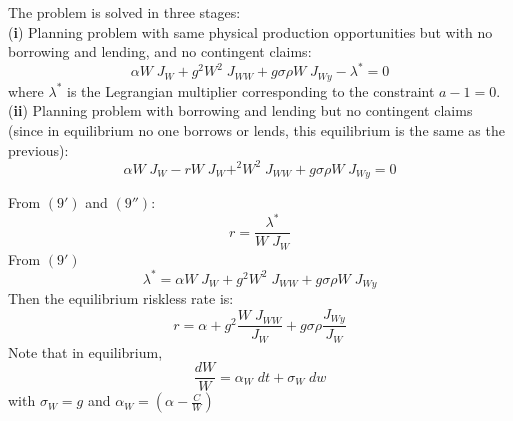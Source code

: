 \documentclass[
14pt,notheorems,hyperref={pdfauthor=whatever}
]{beamer}
\begin{document}
\begin{frame}
The problem is solved in three stages:\\
\hfill\break
(\textbf{i}) Planning problem with same physical production opportunities but with no borrowing and lending, and no contingent claims:\\
\begin{equation} \tag{9'}
    \alpha W \;J_W + g^2W^2 \;J_{WW} + g\sigma \rho W \;J_{Wy} - \lambda^* = 0
\end{equation}
where $\lambda^*$ is the Legrangian multiplier corresponding to the constraint $a-1=0$.\\
\hfill\break
(\textbf{ii}) Planning problem with borrowing and lending but no contingent claims (since in equilibrium no one borrows or lends, this equilibrium is the same as the previous):\\
\begin{equation} \tag{9''}
    \alpha W \;J_W - r W\;J_W + ^2W^2\;J_{WW} + g\sigma \rho W \;J_{Wy} = 0
\end{equation}
\end{frame}

\begin{frame}
From $(9')$ and $(9'')$:
\[ r = \frac{\lambda^*}{W\;J_W} \]
From $(9')$
\[ \lambda^* = \alpha W\;J_W + g^2W^2\;J_{WW} + g\sigma\rho W\;J_{Wy}\]
\hfill
Then the equilibrium riskless rate is:\\
\begin{equation} \tag{11}
    r = \alpha + g^2 \frac{W\;J_{WW}}{J_W} + g\sigma\rho \frac{J_{Wy}}{J_W}
\end{equation}
Note that in equilibrium,
\[ \frac{dW}{W} = \alpha_W\;dt + \sigma_W\;dw \]
with $\sigma_W = g$ and $\alpha_W = (\alpha-\frac{C}{W})$
\end{frame}

\end{document}
